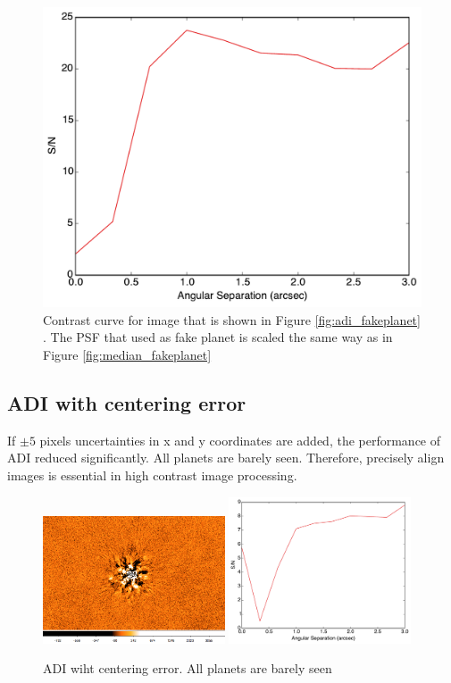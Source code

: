 \documentclass[paper=letter, fontsize=11pt]{scrartcl} %
\numberwithin{equation}{section} %
\numberwithin{figure}{section} %
\numberwithin{table}{section} %
\begin{document}
  \begin{figure}
   \centering
   \includegraphics[width=\textwidth]{adi_contrastCurve_amp=2000}
   \caption{Contrast curve for image that is shown in Figure
     \ref{fig:adi_fakeplanet} . The PSF that used as fake planet is
     scaled the same way as in Figure \ref{fig:median_fakeplanet}}
   \label{fig:adi_median_curve}
 \end{figure}

 \subsection{ADI with centering error}
 If $\pm 5$ pixels uncertainties in x and y coordinates are added, the
 performance of ADI reduced significantly. All planets are barely
 seen. Therefore, precisely align images is essential in high contrast
 image processing.
 \begin{figure}
   \centering
   \includegraphics[width=0.48\textwidth]{adi_with_error}
   \includegraphics[width=0.48\textwidth]{adiwithErrorCurve}
   \caption{ADI wiht centering error. All planets are barely seen}
   \label{fig:adi_with_error}
 \end{figure}
 
\end{document}
